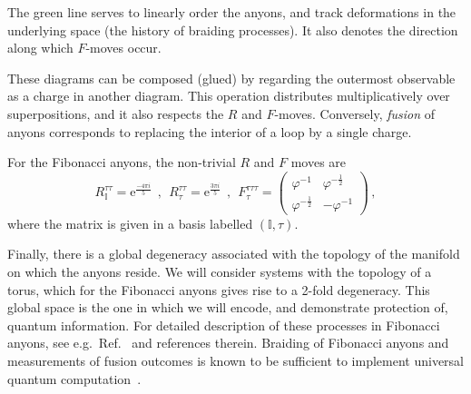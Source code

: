 \documentclass[aps, prl, letterpaper, twocolumn, superscriptaddress, notitlepage, 10pt]{revtex4-1}
\newcommand{\e}{\mathrm{e}}
\newcommand{\vac}{\mathbb{I}}
\newcommand{\dude}[1]{\textcolor{red}{#1}}
\begin{document}
The green line serves to linearly
order the anyons, and track
deformations in the underlying space 
(the history of braiding processes).
It also denotes the direction along
which $F$-moves occur.

These diagrams can be composed (glued)
by regarding the outermost observable
as a charge in another diagram.
This operation distributes multiplicatively
over superpositions, and it also respects the $R$ and $F$-moves.
Conversely, \emph{fusion} of anyons corresponds to 
replacing the interior of a loop by a single charge.



For the Fibonacci anyons, the non-trivial $R$ and $F$ moves are 
\begin{equation*}
	R_{\vac}^{\tau\tau} = \e^{\frac{-4\pi i}{5}} 
	\ \ , \ \
	R_\tau^{\tau\tau}= \e^{\frac{3\pi i}{5}} 
	\ \ , \ \
	F_{\tau}^{\tau\tau\tau} = \begin{pmatrix}\varphi^{-1}&\varphi^{-\frac{1}{2}}\\\varphi^{-\frac{1}{2}}&-\varphi^{-1}\end{pmatrix} \,,
\end{equation*}
where the matrix is given in a basis labelled $(\vac,\tau)$.

Finally, there is a global degeneracy associated with the topology of the 
manifold on which the anyons reside. We will consider systems with the topology of a torus, 
which for the Fibonacci anyons gives rise to a 2-fold degeneracy.
This global space is the one in which we will encode, and demonstrate protection of, quantum 
information. 
For detailed description of these 
processes in Fibonacci anyons, see e.g.~Ref.~\cite{Nayak2008} and references therein. 
Braiding of Fibonacci anyons and measurements of fusion outcomes is known to be 
sufficient to implement universal quantum computation~\cite{Freedman2002, Nayak2008}.
\end{document}
